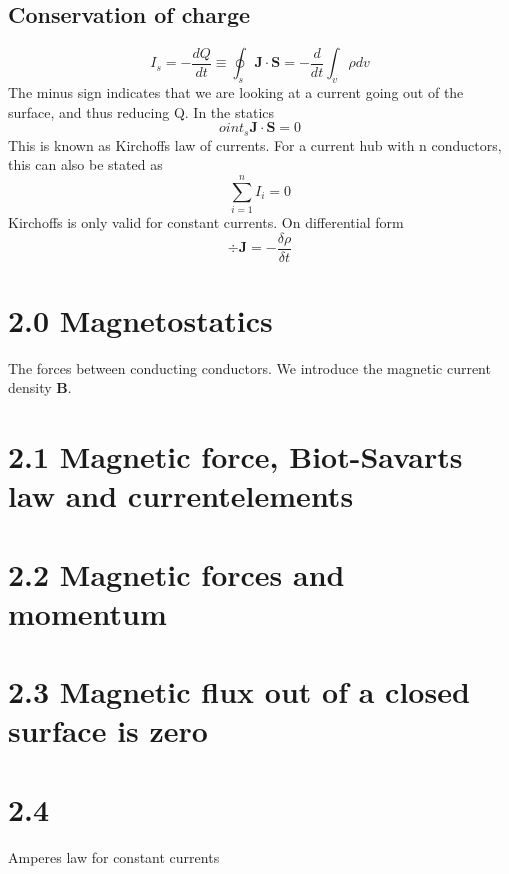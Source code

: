 \documentclass[
12pt, reprint, aip, onecolumn, notitlepage
]{revtex4-1}
\begin{document}
\subsection{Conservation of charge}
\begin{equation}
	I_s = -\dfrac{dQ}{dt} \equiv \oint_s \mathbf{J}\cdot \mathbf{S} = -\dfrac{d}{dt}\int_v\rho dv
\end{equation}
The minus sign indicates that we are looking at a current going out of the surface, and thus reducing Q. In the statics
\begin{equation}
	oint_s \mathbf{J}\cdot \mathbf{S} = 0
\end{equation}
This is known as Kirchoffs law of currents.
For a current hub with n conductors, this can also be stated as
\begin{equation}
	\sum_{i=1}^{n} I_i = 0
\end{equation}
Kirchoffs is only valid for constant currents. 
On differential form 
\begin{equation}
	\div{\mathbf{J}} = -\dfrac{\delta \rho}{\delta t}
\end{equation}

\section{2.0 Magnetostatics}
The forces between conducting conductors. We introduce the magnetic current density $\mathbf{B}$. 
\section{2.1 Magnetic force, Biot-Savarts law and currentelements}

\section{2.2 Magnetic forces and momentum}
\section{2.3 Magnetic flux out of a closed surface is zero}
\section{2.4} Amperes law for constant currents
\end{document}
